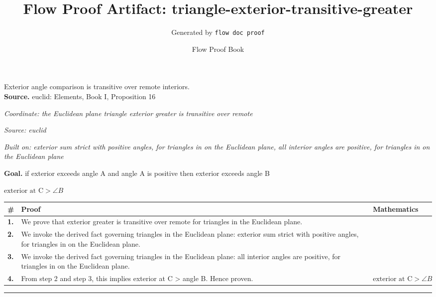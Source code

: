 \documentclass[11pt]{article}
\title{Flow Proof Artifact: triangle-exterior-transitive-greater}
\author{Generated by \texttt{flow doc proof}}
\date{Flow Proof Book}
\theoremstyle{definition}
\begin{document}
\maketitle
Exterior angle comparison is transitive over remote interiors.\\[0.5em]
\textbf{Source.} euclid: Elements, Book I, Proposition 16\\[0.5em]
\bigskip
{}\par
\smallskip\noindent\textit{Coordinate: the Euclidean plane \cdot triangle \cdot exterior greater is transitive over remote}\par
\smallskip\noindent\textit{Source: euclid}\par
\smallskip\noindent\textit{Built on: exterior sum strict with positive angles, for triangles in on the Euclidean plane, all interior angles are positive, for triangles in on the Euclidean plane}\par
\medskip
\noindent\textbf{Goal.} if exterior exceeds angle A and angle A is positive then exterior exceeds angle B\par
\noindent$\displaystyle \text{exterior at C} > \angle B$\par
\medskip
\noindent
\begin{tabular}{@{} >{\raggedright\arraybackslash}p{} >{\raggedright\arraybackslash}p{} >{\raggedleft\arraybackslash}p{} @{}}
\textbf{\#} & \textbf{Proof} & \textbf{Mathematics} \\
\midrule
\textbf{1.} & We prove that exterior greater is transitive over remote for triangles in the Euclidean plane. & \\[0.45em]
\textbf{2.} & We invoke the derived fact governing triangles in the Euclidean plane: exterior sum strict with positive angles, for triangles in on the Euclidean plane. & \\[0.45em]
\textbf{3.} & We invoke the derived fact governing triangles in the Euclidean plane: all interior angles are positive, for triangles in on the Euclidean plane. & \\[0.45em]
\textbf{4.} & From step 2 and step 3, this implies exterior at C > angle B. Hence proven. & $\displaystyle \text{exterior at C} > \angle B$ \\[0.45em]
\bottomrule
\end{tabular}
\label{thm:Geometry-triangle-exterior_greater_is_transitive_over_remote}
\par\medskip\hrule
\end{document}
